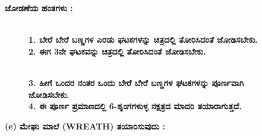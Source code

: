  \noindent
 \textbf{ಜೋಡಣೆಯ ಹಂತಗಳು :}
 \begin{figure}[H]
\\
\textbf{1. ಬೇರೆ ಬೇರೆ ಬಣ್ಣಗಳ ಎರಡು ಘಟಕಗಳನ್ನು ಚಿತ್ರದಲ್ಲಿ ತೋರಿಸಿದಂತೆ ಜೋಡಿಸಬೇಕು.}\\
\textbf{2. ಈಗ 3ನೇ ಘಟಕವನ್ನು ಚಿತ್ರದಲ್ಲಿ ತೋರಿಸಿದಂತೆ ಜೋಡಿಸಬೇಕು.}
\end{figure}
 \begin{figure}[H]
\\
\textbf{3. ಹೀಗೆ ಒಂದರ ನಂತರ ಒಂದು ಬೇರೆ ಬೇರೆ ಬಣ್ಣಗಳ ಘಟಕಗಳನ್ನು ಪೂರ್ಣವಾಗಿ ಜೋಡಿಸಬೇಕು.}\\
\textbf{4. ಈ ಪೂರ್ಣ ಪ್ರಮಾಣದಲ್ಲಿ 6-ಶೃಂಗಗಳುಳ್ಳ ನಕ್ಷತ್ರದ ಮಾದರಿ ತಯಾರಾಗುತ್ತದೆ.}
\end{figure}


\noindent
\textbf{(e) ಮೇಘು ಮಾಲೆ (WREATH) ತಯಾರಿಸುವುದು :}   

